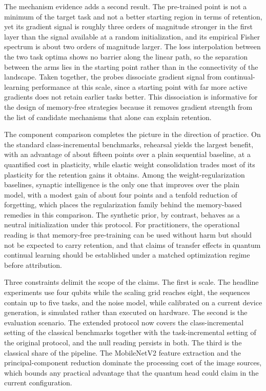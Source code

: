 \documentclass[preprint,number,sort&compress]{elsarticle}
\begin{document}
The mechanism evidence adds a second result. The pre-trained point is not a
minimum of the target task and not a better starting region in terms of
retention, yet its gradient signal is roughly three orders of magnitude
stronger in the first layer than the signal available at a random
initialization, and its empirical Fisher spectrum is about two orders of
magnitude larger. The loss interpolation between the two task optima shows
no barrier along the linear path, so the separation between the arms lies
in the starting point rather than in the connectivity of the landscape.
Taken together, the probes dissociate gradient signal from
continual-learning performance at this scale, since a starting point with
far more active gradients does not retain earlier tasks better. This
dissociation is informative for the design of memory-free strategies
because it removes gradient strength from the list of candidate mechanisms
that alone can explain retention.

The component comparison completes the picture in the direction of
practice. On the standard class-incremental benchmarks, rehearsal yields the
largest benefit, with an advantage of about fifteen points over a plain
sequential baseline, at a quantified cost in plasticity, while elastic
weight consolidation trades most of its plasticity for the retention
gains it obtains. Among the weight-regularization baselines, synaptic
intelligence is the only one that improves over the plain model, with a
modest gain of about four points and a tenfold reduction of forgetting,
which places the regularization family behind the memory-based remedies
in this comparison. The synthetic prior, by
contrast, behaves as a neutral initialization under this protocol. For
practitioners, the operational reading is that memory-free pre-training
can be used without harm but should not be expected to carry retention,
and that claims of transfer effects in quantum continual learning should
be established under a matched optimization regime before attribution.

Three constraints delimit the scope of the claims. The first is scale. The
headline experiments use four qubits while the scaling grid reaches eight,
the sequences contain up to five tasks, and the noise model, while
calibrated on a current device generation, is simulated rather than
executed on hardware. The second is the evaluation scenario. The extended
protocol now covers the class-incremental setting of the classical
benchmarks \cite{Ven22} together with the task-incremental setting of the
original protocol, and the null reading persists in both. The third is the
classical share of the pipeline. The MobileNetV2 feature extraction and
the principal-component reduction dominate the processing cost of the image
sources, which bounds any practical advantage that the quantum head could
claim in the current configuration.
\end{document}
